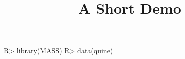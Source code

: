 \documentclass[article]{jss}
\title{A Short Demo}
\begin{document}
\begin{CodeInput}
R> library(MASS)
R> data(quine)
\end{CodeInput}
\end{document}
